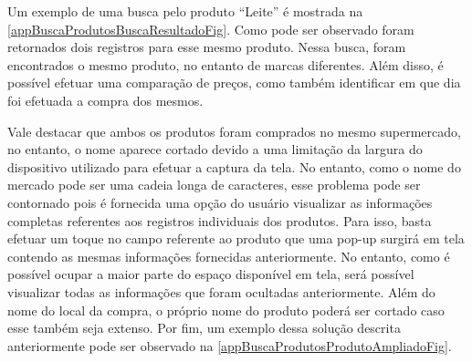 Um exemplo de uma busca pelo produto ``Leite'' é mostrada na \autoref{appBuscaProdutosBuscaResultadoFig}. Como pode ser observado foram retornados dois registros para esse mesmo produto. Nessa busca, foram encontrados o mesmo produto, no entanto de marcas diferentes. Além disso, é possível efetuar uma comparação de preços, como também identificar em que dia foi efetuada a compra dos mesmos.

Vale destacar que ambos os produtos foram comprados no mesmo supermercado, no entanto, o nome aparece cortado devido a uma limitação da largura do dispositivo utilizado para efetuar a captura da tela. No entanto, como o nome do mercado pode ser uma cadeia longa de caracteres, esse problema pode ser contornado pois é fornecida uma opção do usuário visualizar as informações completas referentes aos registros individuais dos produtos. Para isso, basta efetuar um toque no campo referente ao produto que uma pop-up surgirá em tela contendo as mesmas informações fornecidas anteriormente. No entanto, como é possível ocupar a maior parte do espaço disponível em tela, será possível visualizar todas as informações que foram ocultadas anteriormente. Além do nome do local da compra, o próprio nome do produto poderá ser cortado caso esse também seja extenso. Por fim, um exemplo dessa solução descrita anteriormente pode ser observado na \autoref{appBuscaProdutosProdutoAmpliadoFig}.

